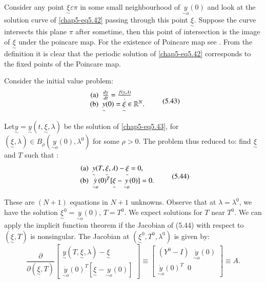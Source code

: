   Consider any point $\underset{\sim}{\xi} \varepsilon \pi$ in some
  small neighbourhood of $\underset{\sim o}{y}(0)$ and look at the
  solution curve of \eqref{chap5-eq5.42} passing through this point
  $\underset{\sim}{\xi}$. Suppose the curve intersects this plane
  $\pi$ after sometime, then this point  of intersection is the image
  of $\underset{\sim}{\xi}$ under the poincare map. For the existence
  of Poincare map see \cite{key25}. From the definition  it is clear that
  the periodic solution of \eqref{chap5-eq5.42} corresponds to the fixed points
  of the Poincare map.   
  
  Consider the initial value problem:
  \begin{equation*}
\begin{array}{r@{\;\;}l}
\text{(a)}  & \frac{dy}{dt} =  \frac{f(y, \lambda)},\\
 \text{(b)} & \underset{\sim}{y}(0)= \underset{\sim}{\xi} \in
 \mathbb{R}^N. 
\end{array}\tag{5.43}\label{chap5-eq5.43} 
  \end{equation*}
  
  Let\pageoriginale $\underset{\sim}{y}= \underset{\sim}{y}(t,
  \underset{\sim}{\xi} 
  , \lambda)$ be the solution of \eqref{chap5-eq5.43}, for
  $(\underset{\sim}{\xi}, 
  \lambda) \in B_\rho (\underset{\sim o}{y}(0), \lambda^0)$
  for some $\rho > 0$. The problem thus reduced to: find
  $\underset{\sim}{\xi}$ and $T$ such that : 
  \begin{equation*}
\begin{array}{r@{\;\;}l}
\text{(a)} & \underset{\sim}{y}(T,  \underset{\sim}{\xi}, \lambda) -
\underset{\sim}{\xi} =0,\\ 
\text{(b)} & \underset{\sim o}{\dot{y}} (0)^T [\underset{\sim}{\xi}-
  \underset{\sim o}{y}(0)]=0.  
\end{array}\tag{5.44}\label{chap5-eq5.44}
  \end{equation*}

  These are $(N+1)$ equations in $N+1$ unknowns. Observe that
  at $\lambda = \lambda^0$, we have the solution
  $\underset{\sim}{\xi}^0 = \underset{\sim o}{y}(0)$, $T=T^0$. We expect
  solutions for $T$ near $T^0$. We can apply the implicit function
  theorem if the Jacobian of (5.44) with respect to
  $(\underset{\sim}{\xi},T)$ is nonsingular. The Jacobian at
  $(\underset{\sim}{\xi}^0, T^0, \lambda^0)$ is given by:   
  $$
  \frac{\partial}{\partial(\underset{\sim}{\xi},T)} \begin{bmatrix}\underset{\sim}{y}(T,\underset{\sim}{\xi},\lambda)-\underset{\sim}{\xi} 
    \\ \underset{\sim o}{\dot{y}}(0)^T[\underset{\sim}{\xi} -
      \underset{\sim o}{y}(0)]\end{bmatrix}
  \equiv \begin{bmatrix}(Y^0-I) \;\; \underset{\sim o}{\dot{y}}(0)
    \\ \underset{\sim o}{\dot{y}}(0)^T \;\;   0\end{bmatrix} \equiv A. 
  $$

